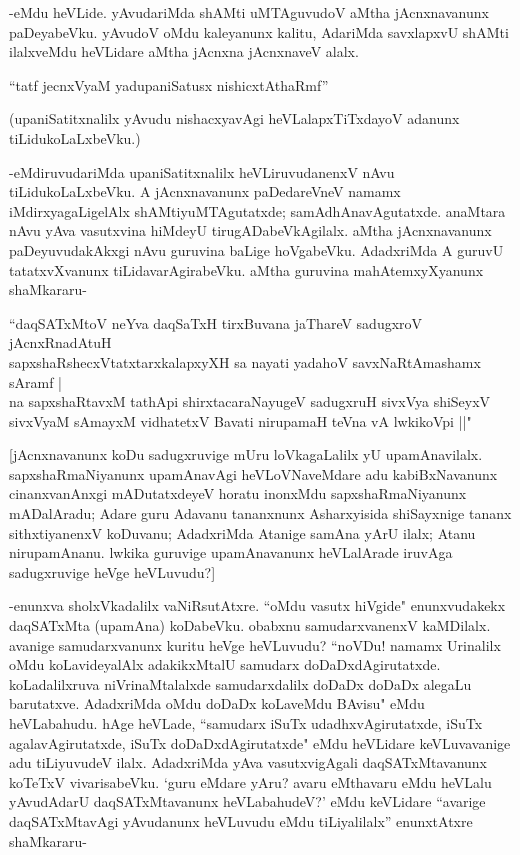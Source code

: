 -eMdu heVLide. yAvudariMda shAMti uMTAguvudoV aMtha jAcnxnavanunx paDeyabeVku. yAvudoV oMdu kaleyanunx kalitu, AdariMda savxlapxvU shAMti ilalxveMdu heVLidare aMtha jAcnxna jAcnxnaveV alalx. 

\begin{shloka}
``tatf jecnxVyaM yadupaniSatusx nishicxtAthaRmf''
\end{shloka}

(upaniSatitxnalilx yAvudu nishacxyavAgi heVLalapxTiTxdayoV adanunx tiLidukoLaLxbeVku.)

-eMdiruvudariMda upaniSatitxnalilx heVLiruvudanenxV nAvu tiLidukoLaLxbeVku. A jAcnxnavanunx paDedareVneV namamx iMdirxyagaLigelAlx shAMtiyuMTAgutatxde; samAdhAnavAgutatxde. anaMtara nAvu yAva vasutxvina hiMdeyU tirugADabeVkAgilalx. aMtha jAcnxnavanunx paDeyuvudakAkxgi nAvu guruvina baLige hoVgabeVku. AdadxriMda A guruvU tatatxvXvanunx tiLidavarAgirabeVku. aMtha guruvina mahAtemxyXyanunx shaMkararu-

\begin{shloka}
``daqSATxMtoV neYva daqSaTxH tirxBuvana jaThareV sadugxroV jAcnxRnadAtuH\\
sapxshaRshecxVtatxtarxkalapxyXH sa nayati yadahoV savxNaRtAmashamx sAramf |\\
na sapxshaRtavxM tathApi shirxtacaraNayugeV sadugxruH sivxVya shiSeyxV\\
sivxVyaM sAmayxM vidhatetxV Bavati nirupamaH teVna vA lwkikoV\s pi ||" 
\end{shloka}

[jAcnxnavanunx koDu sadugxruvige mUru loVkagaLalilx yU upamAnavilalx. sapxshaRmaNiyanunx upamAnavAgi heVLoVNaveMdare adu kabiBxNavanunx cinanxvanAnxgi mADutatxdeyeV horatu inonxMdu sapxshaRmaNiyanunx mADalAradu; Adare guru Adavanu tananxnunx Asharxyisida shiSayxnige tananx sithxtiyanenxV koDuvanu; AdadxriMda Atanige samAna yArU ilalx; Atanu nirupamAnanu. lwkika guruvige upamAnavanunx heVLalArade iruvAga sadugxruvige heVge heVLuvudu?]

-enunxva sholxVkadalilx vaNiRsutAtxre. ``oMdu vasutx hiVgide" enunxvudakekx daqSATxMta (upamAna) koDabeVku. obabxnu samudarxvanenxV kaMDilalx. avanige samudarxvanunx kuritu heVge heVLuvudu? ``noVDu! namamx Urinalilx oMdu koLavideyalAlx adakikxMtalU samudarx doDaDxdAgirutatxde. koLadalilxruva niVrinaMtalalxde samudarxdalilx doDaDx doDaDx alegaLu barutatxve. AdadxriMda oMdu doDaDx koLaveMdu BAvisu" eMdu heVLabahudu. hAge heVLade, ``samudarx iSuTx udadhxvAgirutatxde, iSuTx agalavAgirutatxde, iSuTx doDaDxdAgirutatxde" eMdu heVLidare keVLuvavanige adu tiLiyuvudeV ilalx. AdadxriMda yAva vasutxvigAgali daqSATxMtavanunx koTeTxV vivarisabeVku. `guru eMdare yAru? avaru eMthavaru eMdu heVLalu yAvudAdarU daqSATxMtavanunx heVLabahudeV?' eMdu keVLidare ``avarige daqSATxMtavAgi yAvudanunx heVLuvudu eMdu tiLiyalilalx'' enunxtAtxre shaMkararu-

